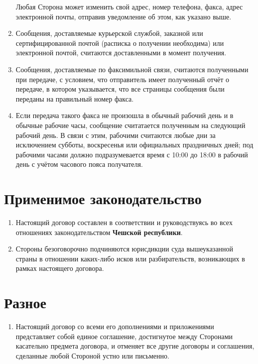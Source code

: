 \begin{Form}
\begin{enumerate}[label=\thesection.\arabic*.]
\begin{itemize}
               \end{itemize}
               Любая Сторона  может изменить свой адрес, номер телефона, факса, адрес электронной почты,
               отправив уведомление об этом, как указано выше. %
         \item Сообщения, доставляемые курьерской службой, заказной или сертифицированной почтой (расписка о получении необходима)
               или электронной почтой, считаются доставленными в момент получения.
         \item Сообщения, доставляемые по факсимильной связи, считаются полученными при передаче, с условием, что отправитель
               имеет полученный отчёт о передаче, в котором указывается, что все страницы сообщения были переданы на правильный
               номер факса.
         \item Если передача такого факса не произошла в обычный рабочий день и в обычные рабочие часы,
               сообщение считатается полученным на следующий рабочий день. В связи с этим, рабочими считаются любые дни
               за исключением субботы, воскресенья или официальных праздничных дней; под рабочими часами должно подразумевается время
               с 10:00 до 18:00 в рабочий день с учётом часового пояса получателя.
                       
        \end{enumerate}


    \section{Применимое законодательство}\label{sec:law}
        \begin{enumerate}[label=\thesection.\arabic*.]
         \item Настоящий договор составлен в соответствии и руководствуясь во всех отношениях
               законодательством \textbf{Чешской республики}.
         \item Стороны безоговорочно подчиняются юрисдикции суда вышеуказанной страны в отношении каких-либо исков
               или разбирательств, возникающих в рамках настоящего договора.
        \end{enumerate}%

    \section{Разное}
        \begin{enumerate}[label=\thesection.\arabic*.]
         \item Настоящий договор со всеми его дополнениями и приложениями представляет собой единое соглашение,
               достигнутое между Сторонами касательно предмета договора, и отменяет все другие договоры и соглашения,
               сделанные любой Стороной устно или письменно.
        \end{enumerate}


\end{Form}

